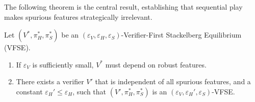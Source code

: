 The following theorem is the central result, establishing that sequential play makes spurious features strategically irrelevant.

\begin{theorem}\label{thm:B.refine}
Let $(V^*, \pi_H^*, \pi_S^*)$ be an $(\varepsilon_V, \varepsilon_H, \varepsilon_S)$-Verifier-First Stackelberg Equilibrium (VFSE).
\begin{enumerate}
    \item If $\varepsilon_V$ is sufficiently small, $V^*$ must depend on robust features.
    \item There exists a verifier $V'$ that is independent of all spurious features, and a constant $\varepsilon_H' \le \varepsilon_H$, such that $(V', \pi_H^*, \pi_S^*)$ is an $(\varepsilon_V, \varepsilon_H', \varepsilon_S)$-VFSE.
\end{enumerate}
\end{theorem}

